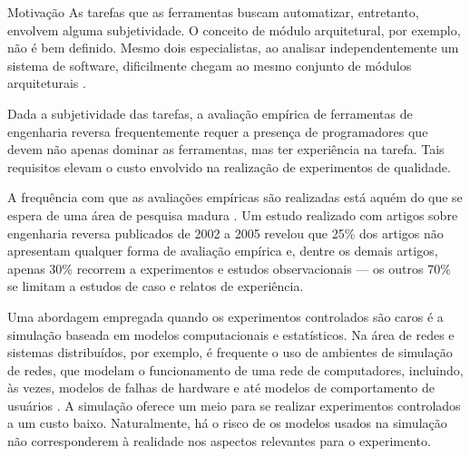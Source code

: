 \begin{section}{Motivação}
	As tarefas que as ferramentas buscam automatizar, entretanto, envolvem alguma subjetividade. O conceito de módulo arquitetural, por exemplo, não é bem definido. Mesmo dois especialistas, ao analisar independentemente um sistema de software, dificilmente chegam ao mesmo conjunto de módulos arquiteturais \cite{Koschke2000}. %

	Dada a subjetividade das tarefas, a avaliação empírica de ferramentas de engenharia reversa frequentemente requer a presença de programadores que devem não apenas dominar as ferramentas, mas ter experiência na tarefa. Tais requisitos elevam o custo envolvido na realização de experimentos de qualidade.
	 
	
	
	A frequência com que as avaliações empíricas são realizadas está aquém do que se espera de uma área de pesquisa madura \cite{Tonella2007}. Um estudo realizado com artigos sobre engenharia reversa publicados de 2002 a 2005 revelou que 25\% dos artigos não apresentam qualquer forma de avaliação empírica e, dentre os demais artigos, apenas 30\% recorrem a experimentos e estudos observacionais --- os outros 70\% se limitam a estudos de caso e relatos de experiência.


		Uma abordagem empregada quando os experimentos controlados são caros é a simulação baseada em modelos computacionais e estatísticos. Na área de redes e sistemas distribuídos, por exemplo, é frequente o uso de ambientes de simulação de redes, que modelam o funcionamento de uma rede de computadores, incluindo, às vezes, modelos de falhas de hardware e até modelos de comportamento de usuários \cite{White2002}. A simulação oferece um meio para se realizar experimentos controlados a um custo baixo. Naturalmente, há o risco de os modelos usados na simulação não corresponderem à realidade nos aspectos relevantes para o experimento. %


\end{section}
